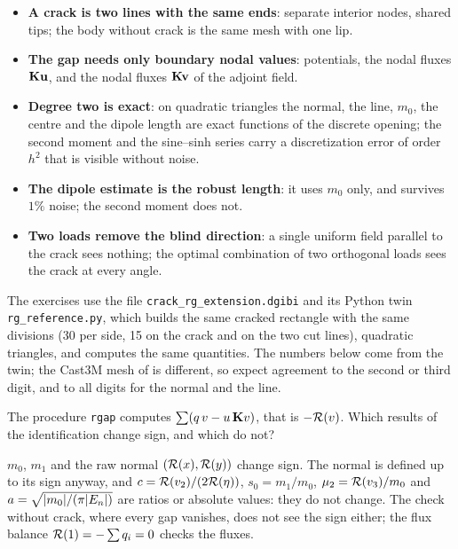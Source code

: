 
\begin{gbox*}
\begin{itemize}
\item \textbf{A crack is two lines with the same ends}: separate interior
  nodes, shared tips; the body without crack is the same mesh with one lip.
\item \textbf{The gap needs only boundary nodal values}: potentials, the
  nodal fluxes $\mathbf{K}\mathbf{u}$, and the nodal fluxes $\mathbf{K}\mathbf{v}$ of the
  adjoint field.
\item \textbf{Degree two is exact}: on quadratic triangles the normal, the
  line, $m_0$, the centre and the dipole length are exact functions of the
  discrete opening; the second moment and the sine--sinh series carry a
  discretization error of order $h^2$ that is visible without noise.
\item \textbf{The dipole estimate is the robust length}: it uses $m_0$ only,
  and survives $1\%$ noise; the second moment does not.
\item \textbf{Two loads remove the blind direction}: a single uniform field
  parallel to the crack sees nothing; the optimal combination of two
  orthogonal loads sees the crack at every angle.
\end{itemize}
\end{gbox*}


The exercises use the file \texttt{crack\_rg\_extension.dgibi} and its Python
twin \texttt{rg\_reference.py}, which builds the same cracked rectangle with
the same divisions (30 per side, 15 on the crack and on the two cut lines),
quadratic triangles, and computes the same quantities. The numbers below come
from the twin; the Cast3M mesh of  is different, so expect agreement to
the second or third digit, and to all digits for the normal and the line.


\label{exo:cc-rg-q-sign}
%
The procedure \texttt{rgap} computes $\sum(q\,v-u\,\mathbf{K}v)$, that is
$-\mathcal{R}(v)$. Which results of the identification change sign, and which do not?
\begin{solution}
$m_0$, $m_1$ and the raw normal $(\mathcal{R}(x),\mathcal{R}(y))$ change sign. The normal is
defined up to its sign anyway, and $c=\mathcal{R}(v_2)/(2\mathcal{R}(\eta))$,
$s_0=m_1/m_0$, $\mu_2=\mathcal{R}(v_3)/m_0$ and $a=\sqrt{\lvert m_0\rvert/(\pi\lvert E_n\rvert)}$ are
ratios or absolute values: they do not change. The check without crack, where
every gap vanishes, does not see the sign either; the flux balance
$\mathcal{R}(1)=-\sum q_i=0$ checks the fluxes.
\end{solution}


